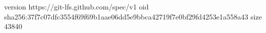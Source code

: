 version https://git-lfs.github.com/spec/v1
oid sha256:37f7c07dfc3554f69f69b1aae06dd5e9bbca42719f7e0bf29fd4253e1a558a43
size 43840
